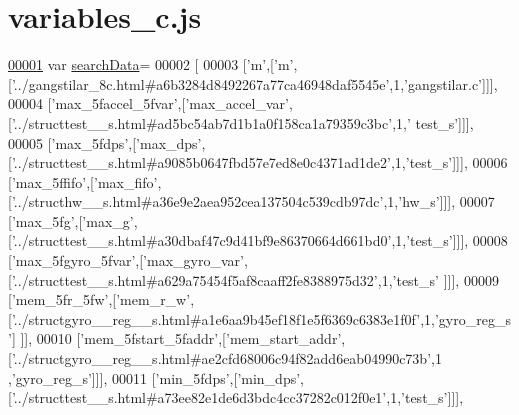 \hypertarget{variables__c_8js_source}{}\section{variables\+\_\+c.\+js}
\label{variables__c_8js_source}

\begin{DoxyCode}
\hypertarget{variables__c_8js_source.tex_l00001}{}\hyperlink{variables__c_8js_ad01a7523f103d6242ef9b0451861231e}{00001} var \hyperlink{variables__c_8js_ad01a7523f103d6242ef9b0451861231e}{searchData}=
00002 [
00003   [\textcolor{charliteral}{'m'},[\textcolor{charliteral}{'m'},[\textcolor{stringliteral}{'../gangstilar\_8c.html#a6b3284d8492267a77ca46948daf5545e'},1,\textcolor{stringliteral}{'gangstilar.c'}]]],
00004   [\textcolor{stringliteral}{'max\_5faccel\_5fvar'},[\textcolor{stringliteral}{'max\_accel\_var'},[\textcolor{stringliteral}{'../structtest\_\_s.html#ad5bc54ab7d1b1a0f158ca1a79359c3bc'},1,\textcolor{stringliteral}{'
      test\_s'}]]],
00005   [\textcolor{stringliteral}{'max\_5fdps'},[\textcolor{stringliteral}{'max\_dps'},[\textcolor{stringliteral}{'../structtest\_\_s.html#a9085b0647fbd57e7ed8e0c4371ad1de2'},1,\textcolor{stringliteral}{'test\_s'}]]],
00006   [\textcolor{stringliteral}{'max\_5ffifo'},[\textcolor{stringliteral}{'max\_fifo'},[\textcolor{stringliteral}{'../structhw\_\_s.html#a36e9e2aea952cea137504c539cdb97dc'},1,\textcolor{stringliteral}{'hw\_s'}]]],
00007   [\textcolor{stringliteral}{'max\_5fg'},[\textcolor{stringliteral}{'max\_g'},[\textcolor{stringliteral}{'../structtest\_\_s.html#a30dbaf47c9d41bf9e86370664d661bd0'},1,\textcolor{stringliteral}{'test\_s'}]]],
00008   [\textcolor{stringliteral}{'max\_5fgyro\_5fvar'},[\textcolor{stringliteral}{'max\_gyro\_var'},[\textcolor{stringliteral}{'../structtest\_\_s.html#a629a75454f5af8caaff2fe8388975d32'},1,\textcolor{stringliteral}{'test\_s'}
      ]]],
00009   [\textcolor{stringliteral}{'mem\_5fr\_5fw'},[\textcolor{stringliteral}{'mem\_r\_w'},[\textcolor{stringliteral}{'../structgyro\_\_reg\_\_s.html#a1e6aa9b45ef18f1e5f6369c6383e1f0f'},1,\textcolor{stringliteral}{'gyro\_reg\_s'}]
      ]],
00010   [\textcolor{stringliteral}{'mem\_5fstart\_5faddr'},[\textcolor{stringliteral}{'mem\_start\_addr'},[\textcolor{stringliteral}{'../structgyro\_\_reg\_\_s.html#ae2cfd68006c94f82add6eab04990c73b'},1
      ,\textcolor{stringliteral}{'gyro\_reg\_s'}]]],
00011   [\textcolor{stringliteral}{'min\_5fdps'},[\textcolor{stringliteral}{'min\_dps'},[\textcolor{stringliteral}{'../structtest\_\_s.html#a73ee82e1de6d3bdc4cc37282c012f0e1'},1,\textcolor{stringliteral}{'test\_s'}]]],

\end{DoxyCode}
